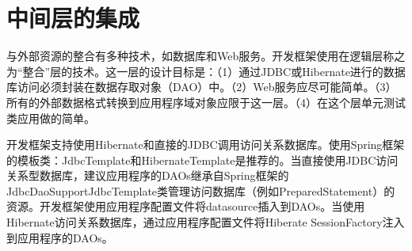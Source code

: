 
\chapter{中间层的集成}
与外部资源的整合有多种技术，如数据库和Web服务。开发框架使用在逻辑层称之为“整合”层的技术。这一层的设计目标是：（1）通过JDBC或Hibernate进行的数据库访问必须封装在数据存取对象（DAO）中。（2）Web服务应尽可能简单。（3）所有的外部数据格式转换到应用程序域对象应限于这一层。（4）在这个层单元测试类应用做的简单。

开发框架支持使用Hibernate和直接的JDBC调用访问关系数据库。使用Spring框架的模板类：JdbcTemplate和HibernateTemplate是推荐的。当直接使用JDBC访问关系型数据库，建议应用程序的DAOs继承自Spring框架的JdbcDaoSupportJdbcTemplate类管理访问数据库（例如PreparedStatement）的资源。开发框架使用应用程序配置文件将datasource插入到DAOs。当使用Hibernate访问关系数据库，通过应用程序配置文件将Hiberate SessionFactory注入到应用程序的DAOs。
